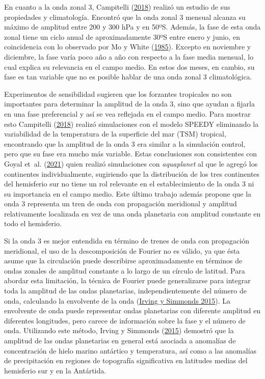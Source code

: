 \documentclass[12pt,oneside,a4paper]{reedthesis}
\begin{document}
En cuanto a la onda zonal 3, Campitelli (\protect\hyperlink{ref-campitelli2018b}{2018}) realizó un estudio de sus propiedades y climatología.
Encontró que la onda zonal 3 mensual alcanza su máximo de amplitud entre 200 y 300 hPa y en 50ºS.
Además, la fase de esta onda zonal tiene un ciclo anual de aproximadamente 30ºS entre enero y junio, en coincidencia con lo observado por Mo y White (\protect\hyperlink{ref-mo1985}{1985}).
Excepto en noviembre y diciembre, la fase varía poco año a año con respecto a la fase media mensual, lo cual explica su relevancia en el campo medio.
En estos dos meses, en cambio, su fase es tan variable que no es posible hablar de una onda zonal 3 climatológica.

Experimentos de sensibilidad sugieren que los forzantes tropicales no son importantes para determinar la amplitud de la onda 3, sino que ayudan a fijarla en una fase preferencial y así se vea reflejada en el campo medio.
Para mostrar esto Campitelli (\protect\hyperlink{ref-campitelli2018b}{2018}) realizó simulaciones con el modelo SPEEDY eliminando la variabilidad de la temperatura de la superficie del mar (TSM) tropical, encontrando que la amplitud de la onda 3 era similar a la simulación control, pero que su fase era mucho más variable.
Estas conclusiones son consistentes con Goyal et~al. (\protect\hyperlink{ref-goyal2021a}{2021}) quien realizó simulaciones con \emph{aquaplanet} al que le agregó los continentes individualmente, sugiriendo que la distribución de los tres continentes del hemisferio sur no tiene un rol relevante en el establecimiento de la onda 3 ni su importancia en el campo medio.
Este último trabajo además propone que la onda 3 representa un tren de onda con propagación meridional y amplitud relativamente localizada en vez de una onda planetaria con amplitud constante en todo el hemisferio.

Si la onda 3 es mejor entendida en término de trenes de onda con propagación meridional, el uso de la descomposición de Fourier no es válido, ya que ésta asume que la circulación puede describirse aproximadamente en términos de ondas zonales de amplitud constante a lo largo de un círculo de latitud.
Para abordar esta limitación, la técnica de Fourier puede generalizarse para integrar toda la amplitud de las ondas planetarias, independientemente del número de onda, calculando la envolvente de la onda (\protect\hyperlink{ref-irving2015}{Irving y Simmonds 2015}).
La envolvente de onda puede representar ondas planetarias con diferente amplitud en diferentes longitudes, pero carece de información sobre la fase y el número de onda.
Utilizando este método, Irving y Simmonds (\protect\hyperlink{ref-irving2015}{2015}) demostró que la amplitud de las ondas planetarias en general está asociada a anomalías de concentración de hielo marino antártico y temperatura, así como a las anomalías de precipitación en regiones de topografía significativa en latitudes medias del hemisferio sur y en la Antártida.
\end{document}

